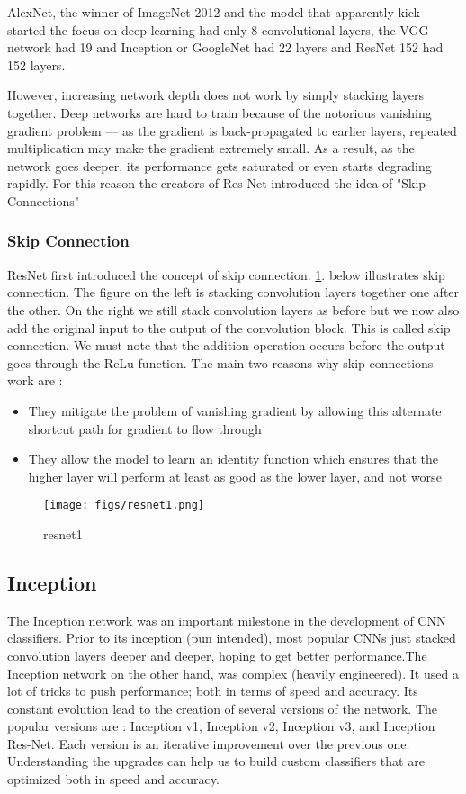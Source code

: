 AlexNet, the winner of ImageNet 2012 and the model that apparently kick started the focus on deep learning had only 8 convolutional layers, the VGG network had 19 and Inception or GoogleNet had 22 layers and ResNet 152 had 152 layers.

However, increasing network depth does not work by simply stacking layers together. Deep networks are hard to train because of the notorious vanishing gradient problem — as the gradient is back-propagated to earlier layers, repeated multiplication may make the gradient extremely small. As a result, as the network goes deeper, its performance gets saturated or even starts degrading rapidly. For this reason the creators of Res-Net introduced the idea of "Skip Connections"

\subsubsection{Skip Connection}

ResNet first introduced the concept of skip connection. \cref{fig:resnet1}. below illustrates skip connection. The figure on the left is stacking convolution layers together one after the other. On the right we still stack convolution layers as before but we now also add the original input to the output of the convolution block. This is called skip connection. We must note that the addition operation occurs before the output goes through the ReLu function.
The main two reasons why skip connections work are :

\begin{itemize}
  \item They mitigate the problem of vanishing gradient by allowing this alternate shortcut path for gradient to flow through
  \item They allow the model to learn an identity function which ensures that the higher layer will perform at least as good as the lower layer, and not worse
\end{itemize}

\begin{figure}[!htpb]
	\centering
	\texttt{[image: figs/resnet1.png]}
	\caption{resnet1}\label{fig:resnet1}
\end{figure}

\subsection{Inception}

The Inception network was an important milestone in the development of CNN classifiers. Prior to its inception (pun intended), most popular CNNs just stacked convolution layers deeper and deeper, hoping to get better performance.The Inception network on the other hand, was complex (heavily engineered). It used a lot of tricks to push performance; both in terms of speed and accuracy. Its constant evolution lead to the creation of several versions of the network. The popular versions are : Inception v1, Inception v2, Inception v3, and Inception Res-Net. Each version is an iterative improvement over the previous one. Understanding the upgrades can help us to build custom classifiers that are optimized both in speed and accuracy.

